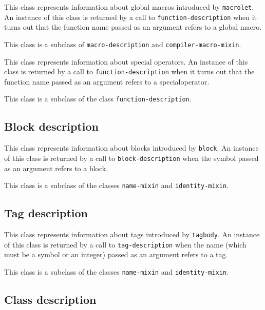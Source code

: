 This class represents information about global macros introduced by
\texttt{macrolet}.  An instance of this class is returned by a call to
\texttt{function-description} when it turns out that the function name passed
as an argument refers to a global macro.

This class is a subclass of \texttt{macro-description} and
\texttt{compiler-macro-mixin}.

{\footnotesize
{}
}

This class represents information about special operators.  An
instance of this class is returned by a call to \texttt{function-description}
when it turns out that the function name passed as an argument refers
to a specialoperator.

This class is a subclass of the class \texttt{function-description}.

\subsection{Block description}
\label{sec-instantiable-classes-block-desciption}

{\footnotesize
{}
}

This class represents information about blocks introduced by
\texttt{block}.  An instance of this class is returned by a call to
\texttt{block-description} when the symbol passed as an argument refers to a
block.

This class is a subclass of the classes \texttt{name-mixin} and
\texttt{identity-mixin}.

\subsection{Tag description}
\label{sec-instantiable-classes-tag-desciption}

{\footnotesize
{}
}

This class represents information about tags introduced by
\texttt{tagbody}.  An instance of this class is returned by a call to
\texttt{tag-description} when the name (which must be a symbol or an integer)
passed as an argument refers to a tag.

This class is a subclass of the classes \texttt{name-mixin} and
\texttt{identity-mixin}.

\subsection{Class description}
\label{sec-instantiable-classes-class-desciption}

